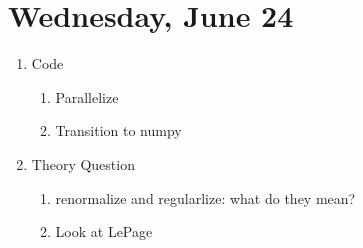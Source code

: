 \documentclass[english]{article}
\begin{document}
 \section{Wednesday, June 24}
    \begin{enumerate}

        \item Code
        \begin{enumerate}
            \item Parallelize
            \item Transition to numpy
        \end{enumerate}
        \item Theory Question
        \begin{enumerate}
            \item renormalize and regularlize: what do they mean?
            \item Look at LePage
        \end{enumerate}

    \end{enumerate}

\nocite{*}


\end{document}

